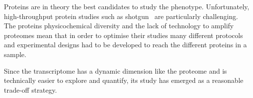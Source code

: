 Proteins are in theory the best candidates to study the phenotype.
Unfortunately, high-throughput protein studies
such as shotgun \ms\ are particularly challenging.
The proteins physicochemical diversity and
the lack of technology to amplify proteomes mean that
in order to optimise their studies many different protocols and experimental designs
had to be developed to reach the different proteins in a sample.\mybr\

Since the transcriptome has a dynamic dimension like the proteome
and is technically easier to explore and quantify,
its study has emerged as a reasonable trade-off strategy.\mybr\

